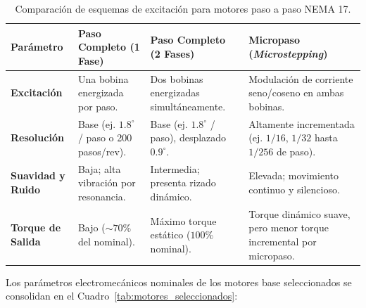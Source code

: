 \documentclass[12pt, a4paper]{article}
\begin{document}
\begin{table}[H]
\centering
\caption{Comparación de esquemas de excitación para motores paso a paso NEMA 17.}
\label{tab:control_stepper}
\begin{tabularx}{\textwidth}{|>{\raggedright\arraybackslash}p{2.5cm}|>{\raggedright\arraybackslash}X|>{\raggedright\arraybackslash}X|>{\raggedright\arraybackslash}X|}
\hline
\textbf{Parámetro} & \textbf{Paso Completo (1 Fase)} & \textbf{Paso Completo (2 Fases)} & \textbf{Micropaso (\textit{Microstepping})} \\ \hline
\textbf{Excitación} & Una bobina energizada por paso. & Dos bobinas energizadas simultáneamente. & Modulación de corriente seno/coseno en ambas bobinas. \\ \hline
\textbf{Resolución} & Base (ej. $1.8^\circ$ / paso o 200 pasos/rev). & Base (ej. $1.8^\circ$ / paso), desplazado $0.9^\circ$. & Altamente incrementada (ej. $1/16$, $1/32$ hasta $1/256$ de paso). \\ \hline
\textbf{Suavidad y Ruido} & Baja; alta vibración por resonancia. & Intermedia; presenta rizado dinámico. & Elevada; movimiento continuo y silencioso. \\ \hline
\textbf{Torque de Salida} & Bajo ($\sim 70\%$ del nominal). & Máximo torque estático ($100\%$ nominal). & Torque dinámico suave, pero menor torque incremental por micropaso. \\ \hline
\end{tabularx}
\end{table}

Los parámetros electromecánicos nominales de los motores base seleccionados se consolidan en el Cuadro~\ref{tab:motores_seleccionados}:
\end{document}
